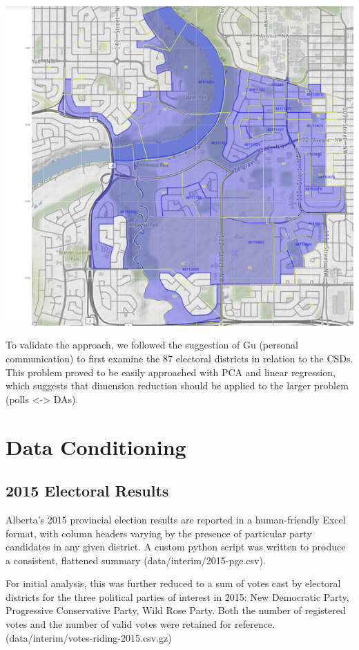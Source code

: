 \documentclass{article}
\begin{document}
\includegraphics[scale=0.4]{figure1-da-poll-overlap-small.png}

To validate the approach, we followed the suggestion of Gu (personal communication) to first examine the 87 electoral districts in relation to the CSDs.  This problem proved to be easily approached with PCA and linear regression, which suggests that dimension reduction should be applied to the larger problem (polls <-> DAs).

\section{Data Conditioning}

\subsection{2015 Electoral Results}

Alberta's 2015 provincial election results are reported in a human-friendly Excel format, with column headers varying by the presence of particular party candidates in any given district.  A custom python script was written to produce a consistent, flattened summary (data/interim/2015-pge.csv).

For initial analysis, this was further reduced to a sum of votes cast by electoral districts for the three political parties of interest in 2015: New Democratic Party, Progressive Conservative Party, Wild Rose Party.  Both the number of registered votes and the number of valid votes were retained for reference.  (data/interim/votes-riding-2015.csv.gz)
\end{document}
